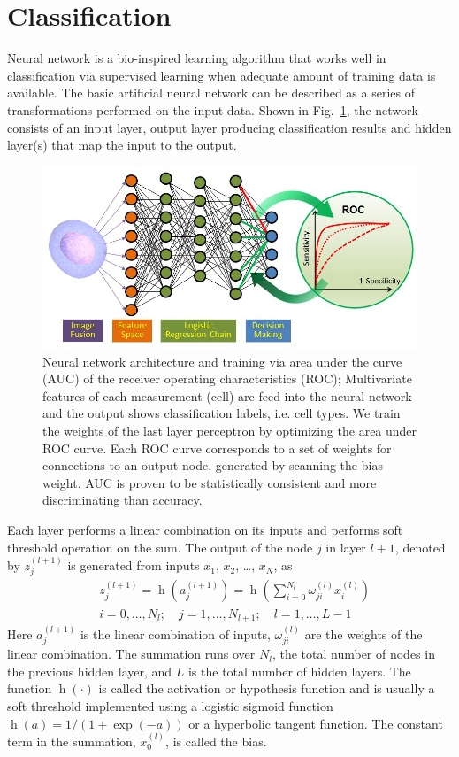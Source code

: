 \documentclass[aps,pra,reprint,superscriptaddress]{revtex4-1}
\DeclareMathOperator{\h}{h} %
\begin{document}
\section{Classification}

Neural network is a bio-inspired learning algorithm that works well in classification via supervised learning when adequate amount of training data is available. The basic artificial neural network can be described as a series of transformations performed on the input data. Shown in Fig.~\ref{fig:NeuralNet}, the network consists of an input layer, output layer producing classification results and hidden layer(s) that map the input to the output. 

\begin{figure}
\includegraphics[scale=0.55]{FigureNeuralNet.jpg}
\caption{\label{fig:NeuralNet} Neural network architecture and training via area under the curve (AUC) of the receiver operating characteristics (ROC); Multivariate features of each measurement (cell) are feed into the neural network and the output shows classification labels, i.e. cell types. We train the weights of the last layer perceptron by optimizing the area under ROC curve. Each ROC curve corresponds to a set of weights for connections to an output node, generated by scanning the bias weight. AUC is proven to be statistically consistent and more discriminating than accuracy.}
\end{figure}

Each layer performs a linear combination on its inputs and performs soft threshold operation on the sum. The output of the node $j$ in layer $l+1$, denoted by $z_j^{(l+1)}$ is generated from inputs $x_1$, $x_2$, \ldots, $x_N$, as
\begin{equation}
\begin{split}
& z_j^{(l+1)} = \h(a_j^{(l+1)}) = \h(\sum_{i=0}^{N_l} \omega_{ji}^{(l)} x_i^{(l)})\\
& i =0,\dotsc,N_l;\quad j=1,\dotsc,N_{l+1};\quad l=1,\dotsc,L-1
\end{split}
\end{equation}
Here $a_j^{(l+1)}$ is the linear combination of inputs, $\omega_{ji}^{(l)}$ are the weights of the linear combination. The summation runs over $N_l$, the total number of nodes in the previous hidden layer, and $L$ is the total number of hidden layers. The function $\h(\cdot)$ is called the activation or hypothesis function and is usually a soft threshold implemented using a logistic sigmoid function $\h(a)=1/(1+\exp(-a))$ or a hyperbolic tangent function. The constant term in the summation, $x_0^{(l)}$, is called the bias.
\end{document}
